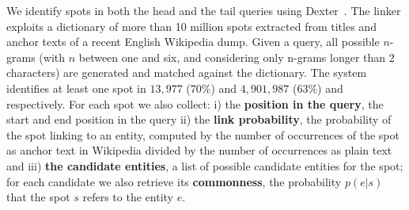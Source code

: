 We identify spots in both the head and the tail queries %
using Dexter~\cite{ceccarelli2013dexter}. The linker exploits a dictionary of 
more than 10 million spots extracted 
from titles and anchor texts of a recent English Wikipedia dump. Given a query, 
all possible $n$-grams (with $n$ between one and six, and considering only n-grams 
longer than 2 characters) are generated and matched against the dictionary. The system identifies 
at least one spot in $13,977$ ($70\%$) and $4,901,987$ ($63\%$) \head{} and \tail{} 
respectively. For each spot we also collect: 
i) the \textbf{position in the query}, the start and end position in the query ii)
 the \textbf{link probability}, the probability
of the spot linking to an entity, computed by the number of occurrences of the spot 
as anchor text in Wikipedia divided by the number of occurrences as plain text and iii)
 \textbf{the candidate entities}, a list of possible candidate entities for the spot; 
 for each candidate we also retrieve its \textbf{commonness}, the probability $p(e|s)$ that
  the spot $s$ refers to the entity $e$.

